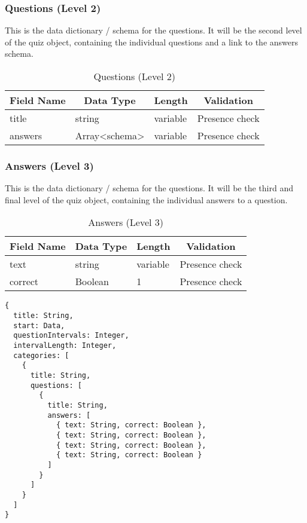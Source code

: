 \subsubsection{Questions (Level 2)}
This is the data dictionary / schema for the questions. It will be the second level of the quiz object, containing the individual questions and a link to the answers schema.

\begin{table}[]
\centering
\begin{tabular}{|l|l|l|l|}
\hline
\multicolumn{1}{|c|}{{\bf Field Name}} & \multicolumn{1}{c|}{{\bf Data Type}} & \multicolumn{1}{c|}{{\bf Length}} & \multicolumn{1}{c|}{{\bf Validation}} \\ \hline
title & string & variable & Presence check \\ \hline
answers & Array<schema> & variable & Presence check \\ \hline
\end{tabular}
\caption{Questions (Level 2)}
\end{table}

\subsubsection{Answers (Level 3)}
This is the data dictionary / schema for the questions. It will be the third and final level of the quiz object, containing the individual answers to a question.

\begin{table}[]
\centering
\begin{tabular}{|l|l|l|l|}
\hline
\multicolumn{1}{|c|}{{\bf Field Name}} & \multicolumn{1}{c|}{{\bf Data Type}} & \multicolumn{1}{c|}{{\bf Length}} & \multicolumn{1}{c|}{{\bf Validation}} \\ \hline
text & string & variable & Presence check \\ \hline
correct & Boolean & 1 & Presence check \\ \hline
\end{tabular}
\caption{Answers (Level 3)}
\end{table}


\begin{Verbatim}[fontsize=\small]
{
  title: String,
  start: Data,
  questionIntervals: Integer,
  intervalLength: Integer,
  categories: [
    {
      title: String,
      questions: [
        {
          title: String,
          answers: [
            { text: String, correct: Boolean },
            { text: String, correct: Boolean },
            { text: String, correct: Boolean },
            { text: String, correct: Boolean }
          ]
        }
      ]
    }
  ]
}
\end{Verbatim}

